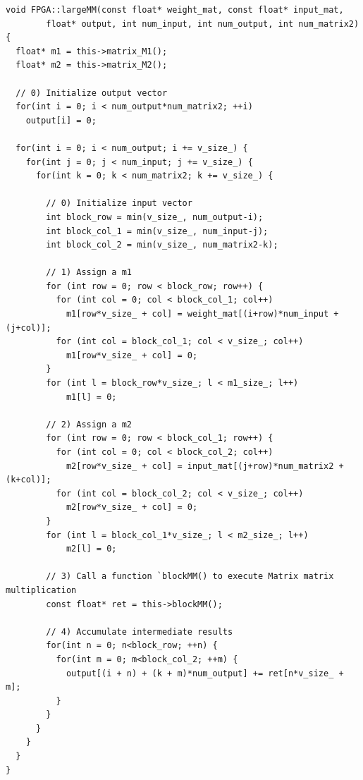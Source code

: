 \documentclass{article}
\begin{document}
\begin{lstlisting}[style={c-style}]
void FPGA::largeMM(const float* weight_mat, const float* input_mat,
        float* output, int num_input, int num_output, int num_matrix2) {
  float* m1 = this->matrix_M1();
  float* m2 = this->matrix_M2();

  // 0) Initialize output vector		
  for(int i = 0; i < num_output*num_matrix2; ++i)
    output[i] = 0;

  for(int i = 0; i < num_output; i += v_size_) {
    for(int j = 0; j < num_input; j += v_size_) {
      for(int k = 0; k < num_matrix2; k += v_size_) {
      
        // 0) Initialize input vector
        int block_row = min(v_size_, num_output-i);
        int block_col_1 = min(v_size_, num_input-j);
        int block_col_2 = min(v_size_, num_matrix2-k);

        // 1) Assign a m1
        for (int row = 0; row < block_row; row++) {
          for (int col = 0; col < block_col_1; col++)
            m1[row*v_size_ + col] = weight_mat[(i+row)*num_input + (j+col)];
          for (int col = block_col_1; col < v_size_; col++)
            m1[row*v_size_ + col] = 0;
        }
        for (int l = block_row*v_size_; l < m1_size_; l++)
            m1[l] = 0;
        
        // 2) Assign a m2
        for (int row = 0; row < block_col_1; row++) {
          for (int col = 0; col < block_col_2; col++)
            m2[row*v_size_ + col] = input_mat[(j+row)*num_matrix2 + (k+col)];
          for (int col = block_col_2; col < v_size_; col++)
            m2[row*v_size_ + col] = 0;  
        }
        for (int l = block_col_1*v_size_; l < m2_size_; l++)
            m2[l] = 0;
        
        // 3) Call a function `blockMM() to execute Matrix matrix multiplication
        const float* ret = this->blockMM();

        // 4) Accumulate intermediate results
        for(int n = 0; n<block_row; ++n) {
          for(int m = 0; m<block_col_2; ++m) {
            output[(i + n) + (k + m)*num_output] += ret[n*v_size_ + m];
          }
        }
      }
    } 
  }
}
\end{lstlisting}
\end{document}
